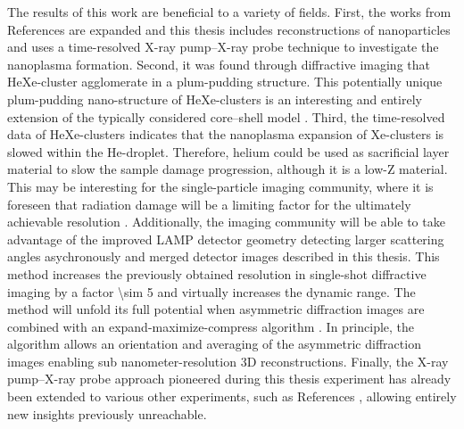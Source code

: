 %
The results of this work are beneficial to a variety of fields. First, the works from References \cite{Hoener-2008-JPB,Gorkhover-2016-NatPho} are expanded and this thesis includes reconstructions of nanoparticles and uses a time-resolved X-ray pump--X-ray probe technique to investigate the nanoplasma formation. Second, it was found through diffractive imaging that HeXe-cluster agglomerate in a plum-pudding structure. This potentially unique plum-pudding nano-structure of HeXe-clusters is an interesting and entirely extension of the typically considered core--shell model \cite{Hau-Riege-2004-PRE,Hau-Riege-2007-PRL,Jurek-2008-EPJ,Jurek-2009-EPL,Hau-Riege-2010-PRL,Hoener-2008-JPB}. Third, the time-resolved data of HeXe-clusters indicates that the nanoplasma expansion of Xe-clusters is slowed within the He-droplet. Therefore, helium could be used as sacrificial layer material to slow the sample damage progression, although it is a low-Z material. This may be interesting for the single-particle imaging community, where it is foreseen that radiation damage will be a limiting factor for the ultimately achievable resolution \citep{Aquila-2015-StrucDyn}. Additionally, the imaging community will be able to take advantage of the improved LAMP detector geometry detecting larger scattering angles asychronously and merged detector images described in this thesis. This method increases the previously obtained resolution in single-shot diffractive imaging by a factor \num{\sim 5} and virtually increases the dynamic range. The method will unfold its full potential when asymmetric diffraction images are combined with an expand-maximize-compress algorithm \citep{Loh-2009-PRE}. In principle, the algorithm allows an orientation and averaging of the asymmetric diffraction images enabling sub nanometer-resolution 3D reconstructions. Finally, the X-ray pump--X-ray probe approach pioneered during this thesis experiment has already been extended to various other experiments, such as References \cite{Lehmann-2016-PRA,Kimberg-2016-FD,Al-Haddad-2017-unpublished,Ferguson-2016-SciAdv,Picon-2016-NatComm}, allowing entirely new insights previously unreachable.
